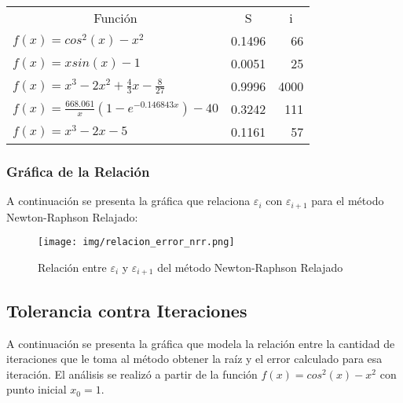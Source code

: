 \documentclass[a4paper,12pt]{article}
\begin{document}
\begin{table}[ht!]
\begin{tabular}{llr}
\multicolumn{1}{c}{Función}                         & \multicolumn{1}{c}{S} & \multicolumn{1}{c}{i} \\
$f(x)=cos^2(x)-x^2$                                 & 0.1496                & 66                    \\
$f(x)=xsin(x)-1$                                    & 0.0051                & 25                    \\
$f(x)=x^3-2x^2+\frac{4}{3}x-\frac{8}{27}$           & 0.9996                & 4000                  \\
$f(x)=\frac{668.061}{x} (1 - e^{-0.146843 x}) - 40$ & 0.3242                & 111                   \\
$f(x)=x^3-2x-5$                                     & 0.1161                & 57                   
\end{tabular}
\end{table}

\vspace{-2em}

\subsubsection{Gráfica de la Relación}

A continuación se presenta la gráfica que relaciona $\varepsilon_i$ con $\varepsilon_{i+1}$ para el método Newton-Raphson Relajado: \par

\vspace{-1em}
\begin{figure}[ht!]
\centering
\texttt{[image: img/relacion\_error\_nrr.png]}
\vspace{-1em}
\caption{Relación entre $\varepsilon_i$ y $\varepsilon_{i+1}$ del método Newton-Raphson Relajado}
\label{fig:relacion_error_nrr}
\end{figure}

\newpage

\subsection{Tolerancia contra Iteraciones}

A continuación se presenta la gráfica que modela la relación entre la cantidad de iteraciones que le toma al método obtener la raíz y el error calculado para esa iteración. El análisis se realizó a partir de la función $f(x)=cos^2(x)-x^2$ con punto inicial $x_0 = 1$. \par
\end{document}
